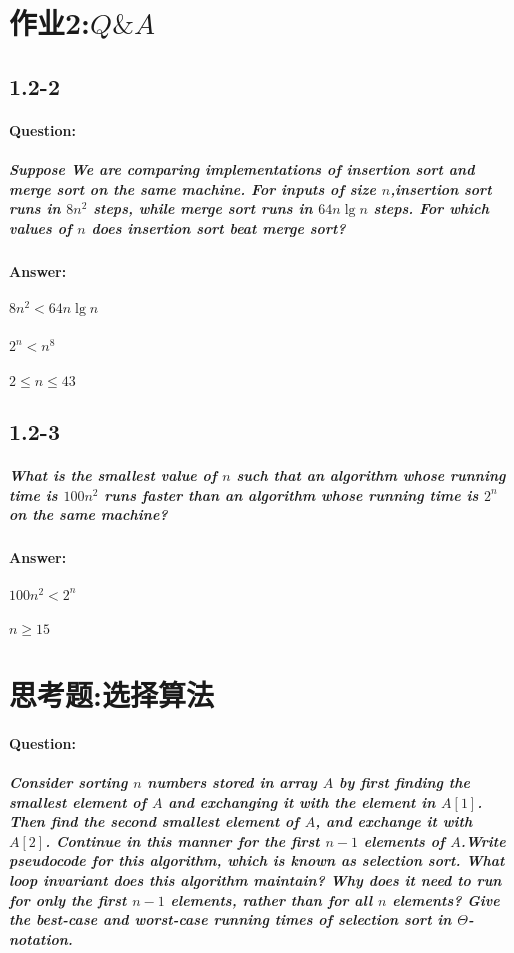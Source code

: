 \documentclass[a4paper]{article}
\begin{document}
\section{作业2:$ Q \& A $}
\subsection{1.2-2}
\paragraph{Question:}
\subparagraph{Suppose We are comparing implementations of insertion sort and merge sort on the same machine. For inputs of size $n$,insertion sort runs in $8n^2$ steps, while merge sort runs in $64n \lg n$ steps. For which values of $n$ does insertion sort beat merge sort?}
\paragraph{Answer:}
\subparagraph{$8n^2<64n \lg n$}
\subparagraph{$2^n<n^8$}
\subparagraph{$2 \leq n \leq 43$}
\subsection{1.2-3}
\subparagraph{What is the smallest value of $n$ such that an algorithm whose running time is $100n^2$ runs faster than an algorithm whose running time is $2^n$ on the same machine?}
\paragraph{Answer:}
\subparagraph{$100n^2<2^n$}
\subparagraph{$n \geq 15$}
\section{思考题:选择算法}
\paragraph{Question:}
\subparagraph{Consider sorting $n$ numbers stored in array $A$ by first finding the smallest element of $A$ and exchanging it with the element in $A[1]$. Then find the second smallest element of $A$, and exchange it with $A[2]$. Continue in this manner for the first $n-1$ elements of $A$.Write pseudocode for this algorithm, which is known as \textbf{selection sort}. What loop invariant does this algorithm maintain? Why does it need to run for only the first $n-1$ elements, rather than for all $n$ elements? Give the best-case and worst-case running times of selection sort in $\Theta$-notation.}
\end{document}
